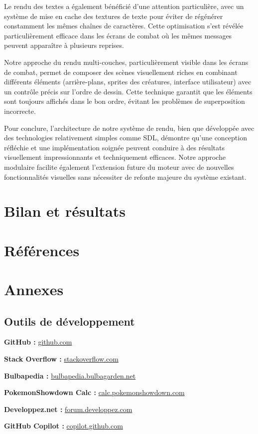 \documentclass[12pt,a4paper, twoside]{article}
\begin{document}
Le rendu des textes a également bénéficié d'une attention particulière, avec un système de mise en cache des textures de texte pour éviter de régénérer constamment les mêmes chaînes de caractères. Cette optimisation s'est révélée particulièrement efficace dans les écrans de combat où les mêmes messages peuvent apparaître à plusieurs reprises.

Notre approche du rendu multi-couches, particulièrement visible dans les écrans de combat, permet de composer des scènes visuellement riches en combinant différents éléments (arrière-plans, sprites des créatures, interface utilisateur) avec un contrôle précis sur l'ordre de dessin. Cette technique garantit que les éléments sont toujours affichés dans le bon ordre, évitant les problèmes de superposition incorrecte.

Pour conclure, l'architecture de notre système de rendu, bien que développée avec des technologies relativement simples comme SDL, démontre qu'une conception réfléchie et une implémentation soignée peuvent conduire à des résultats visuellement impressionnants et techniquement efficaces. Notre approche modulaire facilite également l'extension future du moteur avec de nouvelles fonctionnalités visuelles sans nécessiter de refonte majeure du système existant.
\newpage
\section{Bilan et résultats}
\section{Références}
\section{Annexes}

\subsection{Outils de développement}
\label{annexe:github}
\textbf{GitHub :} \href{https://github.com/Lounol72/ICPocket}{github.com}

\label{annexe:stackoverflow}
\textbf{Stack Overflow :} \href{https://stackoverflow.com/questions/tagged/sdl}{stackoverflow.com}

\label{annexe:bulbapedia}
\textbf{Bulbapedia :} \href{https://bulbapedia.bulbagarden.net/wiki}{bulbapedia.bulbagarden.net}

\label{annexe:showdown}
\textbf{PokemonShowdown Calc :} \href{https://calc.pokemonshowdown.com}{calc.pokemonshowdown.com}

\label{annexe:developpez}
\textbf{Developpez.net :} \href{https://forum.developpez.com}{forum.developpez.com}

\label{annexe:copilot}
\textbf{GitHub Copilot :} \href{https://copilot.github.com/}{copilot.github.com}
\end{document}
